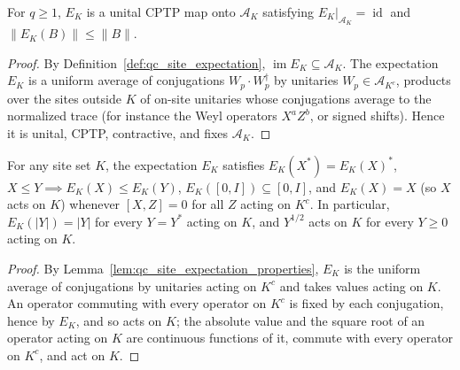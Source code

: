 \begin{lemma}
    \label{lem:qc_site_expectation_properties}
    \leanok
    For $q\geq1$, $E_K$ is a unital CPTP map onto $\mathcal A_K$ satisfying $E_K|_{\mathcal A_K}=\operatorname{id}$ and $\|E_K(B)\|\le\|B\|$.
\end{lemma}
\begin{proof}\leanok
    By Definition~\ref{def:qc_site_expectation}, $\operatorname{im}E_K\subseteq\mathcal A_K$. The expectation $E_K$ is a uniform average of conjugations $W_p\cdot W_p^\dagger$ by unitaries $W_p\in\mathcal A_{K^c}$, products over the sites outside $K$ of on-site unitaries whose conjugations average to the normalized trace (for instance the Weyl operators $X^aZ^b$, or signed shifts). Hence it is unital, CPTP, contractive, and fixes $\mathcal A_K$.
\end{proof}

\begin{lemma}
    \label{lem:al_site_expectation_order}
    \leanok
    For any site set $K$, the expectation $E_K$ satisfies
    $E_K(X^*)=E_K(X)^*$, $X\le Y\implies E_K(X)\le E_K(Y)$,
    $E_K([0,I])\subseteq[0,I]$, and $E_K(X)=X$ (so $X$ acts on $K$) whenever
    $[X,Z]=0$ for all $Z$ acting on $K^c$. In particular, $E_K(|Y|)=|Y|$ for
    every $Y=Y^*$ acting on $K$, and $Y^{1/2}$ acts on $K$ for every $Y\ge0$
    acting on $K$.
\end{lemma}
\begin{proof}\leanok
    By Lemma~\ref{lem:qc_site_expectation_properties}, $E_K$ is the uniform
    average of conjugations by unitaries acting on $K^c$ and takes values
    acting on $K$. An operator commuting with every operator on $K^c$ is fixed
    by each conjugation, hence by $E_K$, and so acts on $K$; the absolute value
    and the square root of an operator acting on $K$ are continuous functions
    of it, commute with every operator on $K^c$, and act on $K$.
\end{proof}

